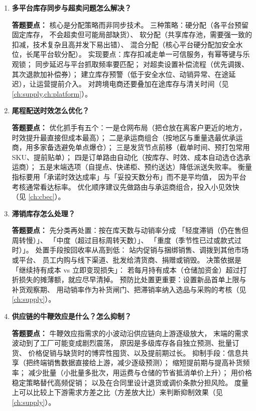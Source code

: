 \begin{interview}[题库与答题要点]
\begin{enumerate}[label=]
  \item[\textcolor{VioletDeep}{\textbf{Q113.}}] \textbf{多平台库存同步与超卖问题怎么解决？}
\par\smallskip\noindent\textcolor{VioletDeep}{\textbf{答题要点：}}
核心是分配策略而非同步技术。
三种策略：硬分配（各平台预留固定库存，
不会超卖但可能局部缺货）、
软分配（共享库存池，需要强一致的扣减，技术复杂且高并发下易出错）、
混合分配（核心平台硬分配加安全水位，长尾平台软分配）。
实现要点：库存扣减走单一可信服务，有幂等键与乐观锁；
同步延迟与平台抓取频率要匹配；
对超卖设置补偿流程（优先调拨、其次退款加补偿券）；
建立库存预警（低于安全水位、动销异常、在途延迟），让运营提前介入。
对跨境电商还要叠加在途库存与清关时间（见 \cref{ch:supply,ch:platform}）。

  \item[\textcolor{VioletDeep}{\textbf{Q114.}}] \textbf{尾程配送时效怎么优化？}
\par\smallskip\noindent\textcolor{VioletDeep}{\textbf{答题要点：}}
优化抓手有五个：一是仓网布局（把仓放在离客户更近的地方，
时效提升最直接但成本最高）；
二是承运商组合（按地区与重量选最优承运商，用多家备选避免单点爆仓）；
三是发货节点前移（截单时间、预打包常用 SKU、提前贴单）；
四是订单路由自动化（按库存、时效、成本自动选仓选承运商）；
五是末端选项（自提点、快递柜、预约送达）降低派送失败率。
衡量指标要用「承诺时效达成率」与「妥投天数分布」而不是平均值，
因为平台考核通常看达标率。
优化顺序建议先做路由与承运商组合，投入小见效快（见 \cref{ch:cbec}）。

  \item[\textcolor{VioletDeep}{\textbf{Q115.}}] \textbf{滞销库存怎么处理？}
\par\smallskip\noindent\textcolor{VioletDeep}{\textbf{答题要点：}}
先分类再处置：按在库天数与动销率分成
「轻度滞销（仍在售但周转慢）」、
「中度（超过目标周转天数）」、
「重度（季节性已过或款式过时）」。
处置手段按回收率从高到低：
站内促销与捆绑销售、调拨到其他市场或平台、
员工内购与线下渠道、批发给清货商、捐赠或销毁。
决策依据是「继续持有成本 vs 立即变现损失」：
若每月持有成本（仓储加资金）超过打折损失的摊薄额，就应尽早清掉。
预防比处置更重要：设置新品首单上限与补货观察期、
用动销率作为补货闸门、把滞销率纳入选品与采购的考核（见 \cref{ch:supply}）。

  \item[\textcolor{VioletDeep}{\textbf{Q116.}}] \textbf{供应链的牛鞭效应是什么？怎么抑制？}
\par\smallskip\noindent\textcolor{VioletDeep}{\textbf{答题要点：}}
牛鞭效应指需求的小波动沿供应链向上游逐级放大，
末端的需求波动到了工厂可能变成剧烈震荡，
原因是多级库存各自独立预测、批量订货、
价格促销与缺货时的博弈性囤货、以及提前期过长。
抑制手段：信息共享（把终端销售数据直接给上游，减少逐级预测）；
缩短提前期与提高补货频率；
减少批量（小批量多批次，用运费与仓储的节省抵消单价上升）；
用价格稳定策略替代高频促销；
以及在合同里设计退货或调价条款分担风险。
度量上可以比较上下游需求方差之比（方差放大比）来判断抑制效果（见 \cref{ch:supply}）。

\end{enumerate}

\end{interview}

